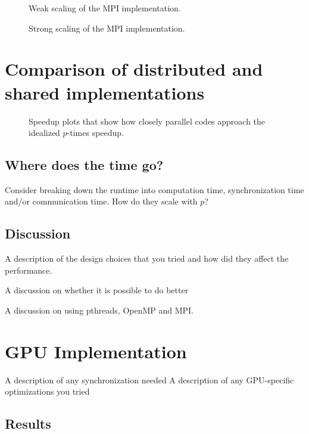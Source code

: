 \documentclass[12pt]{article}
\begin{document}
\begin{figure}
  \caption{Weak scaling of the MPI implementation.}
  \label{fig:mpi-weak}
\end{figure}

\begin{figure}
  \caption{Strong scaling of the MPI implementation.}
  \label{fig:mpi-strong}
\end{figure}

\section{Comparison of distributed and shared implementations}

\begin{figure}
  \caption{Speedup plots that show how closely parallel codes approach the idealized $p$-times speedup.}
  \label{fig:speedup}
\end{figure}

\subsection{Where does the time go?}
Consider breaking down the runtime into computation time, synchronization time and/or communication time. How do they scale with $p$?

\subsection{Discussion}

A description of the design choices that you tried and how did they affect the performance.

A discussion on whether it is possible to do better

A discussion on using pthreads, OpenMP and MPI.

\section{GPU Implementation} \label{GPU}

A description of any synchronization needed
A description of any GPU-specific optimizations you tried

\subsection{Results}
\end{document}
